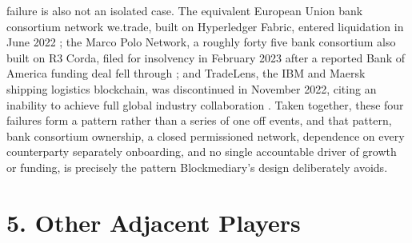\documentclass[12pt, a4paper]{article}
\begin{document}
failure is also not an isolated case. The equivalent European Union bank consortium
network we.trade, built on Hyperledger Fabric, entered liquidation in June 2022
\citep{wetradefuturum}; the Marco Polo Network, a roughly forty five bank consortium also
built on R3 Corda, filed for insolvency in February 2023 after a reported Bank of America
funding deal fell through \citep{marcopoloinsolvency2023}; and TradeLens, the IBM and
Maersk shipping logistics blockchain, was discontinued in November 2022, citing an
inability to achieve full global industry collaboration \citep{tradelens2022}. Taken
together, these four failures form a pattern rather than a series of one off events, and
that pattern, bank consortium ownership, a closed permissioned network, dependence on
every counterparty separately onboarding, and no single accountable driver of growth or
funding, is precisely the pattern Blockmediary's design deliberately avoids.

\section*{5. Other Adjacent Players}
\end{document}
